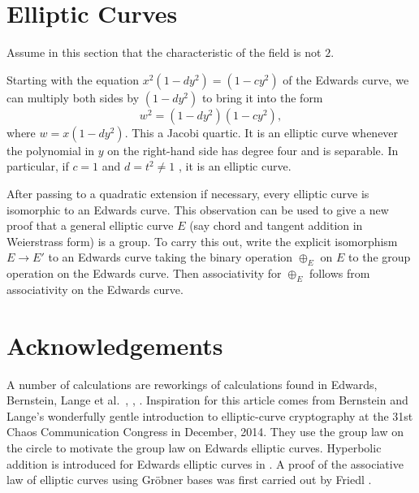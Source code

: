 \documentclass[18pt]{article}
\begin{document}
\section{Elliptic Curves}\label{sec:elliptic}

Assume in this section that the characteristic of the field is not
$2$.



Starting with the equation $x^2 (1-d y^2) = (1 - c y^2)$ of the
Edwards curve, we can multiply both sides by $(1- d y^2)$ to bring it
into the form
\[
w^2 = (1 - d y^2) (1 - c y^2),
\]
where $w = x (1 - d y^2)$.  This a Jacobi quartic.  It is an elliptic
curve whenever the polynomial in $y$ on the right-hand side has degree
four and is separable.  In particular, if $c=1$ and $d=t^2\ne 1$ , it is an
elliptic curve.

After passing to a quadratic extension if necessary, every elliptic
curve is isomorphic to an Edwards curve.  This observation can be used
to give a new proof that a general elliptic curve $E$ (say chord and
tangent addition in Weierstrass form) is a group.  To carry this out, 
write the explicit isomorphism $E\to E'$ to an Edwards curve taking
the binary operation $\oplus_E$ on $E$ to the group operation on the
Edwards curve.  Then associativity for $\oplus_E$ follows from
associativity on the Edwards curve.

\section{Acknowledgements}

A number of calculations are reworkings of
calculations found in Edwards, Bernstein, 
Lange et al.~\cite{edwards2007normal}, \cite{bernstein2008twisted},
\cite{bernstein2007faster}.  Inspiration for this article comes from
Bernstein and Lange's wonderfully gentle introduction to
elliptic-curve cryptography at the 31st Chaos Communication Congress
in December, 2014.  They use the group law on the circle to motivate
the group law on Edwards elliptic curves.  Hyperbolic addition is
introduced for Edwards elliptic curves in \cite{arene2011faster}.  A
proof of the associative law of elliptic curves using Gr\"obner bases was first
carried out by Friedl \cite{friedl}.

 

\end{document}
